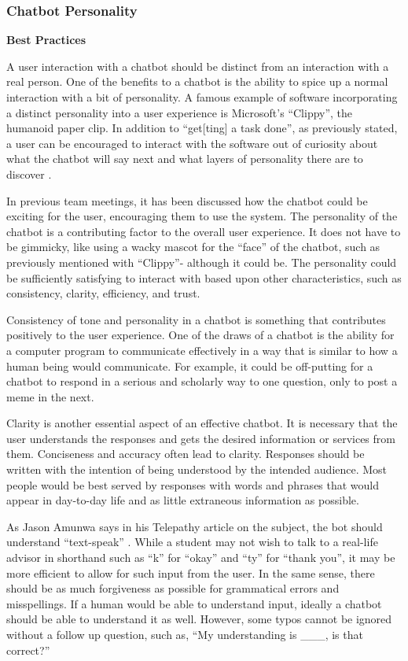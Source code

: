 \documentclass[titlepage, 12pt]{article}
\begin{document}
\subsubsection{Chatbot Personality}

\textbf{Best Practices}

A user interaction with a chatbot should be distinct from an interaction with a real person. One of the benefits to a chatbot is the ability to spice up a normal interaction with a bit of personality. A famous example of software incorporating a distinct personality into a user experience is Microsoft’s “Clippy”, the humanoid paper clip. In addition to “get[ting] a task done”, as previously stated, a user can be encouraged to interact with the software out of curiosity about what the chatbot will say next and what layers of personality there are to discover \cite{bib-1-11}.
 
In previous team meetings, it has been discussed how the chatbot could be exciting for the user, encouraging them to use the system. The personality of the chatbot is a contributing factor to the overall user experience. It does not have to be gimmicky, like using a wacky mascot for the “face” of the chatbot, such as previously mentioned with “Clippy”- although it could be. The personality could be sufficiently satisfying to interact with based upon other characteristics, such as consistency, clarity, efficiency, and trust.
 
Consistency of tone and personality in a chatbot is something that contributes positively to the user experience. One of the draws of a chatbot is the ability for a computer program to communicate effectively in a way that is similar to how a human being would communicate. For example, it could be off-putting for a chatbot to respond in a serious and scholarly way to one question, only to post a meme in the next.
 
Clarity is another essential aspect of an effective chatbot. It is necessary that the user understands the responses and gets the desired information or services from them. Conciseness and accuracy often lead to clarity. Responses should be written with the intention of being understood by the intended audience. Most people would be best served by responses with words and phrases that would appear in day-to-day life and as little extraneous information as possible.
 
As Jason Amunwa says in his Telepathy article on the subject, the bot should understand “text-speak” \cite{bib-1-11}. While a student may not wish to talk to a real-life advisor in shorthand such as “k” for “okay” and “ty” for “thank you”, it may be more efficient to allow for such input from the user. In the same sense, there should be as much forgiveness as possible for grammatical errors and misspellings. If a human would be able to understand input, ideally a chatbot should be able to understand it as well. However, some typos cannot be ignored without a follow up question, such as, “My understanding is \_\_\_, is that correct?”
 
\end{document}
